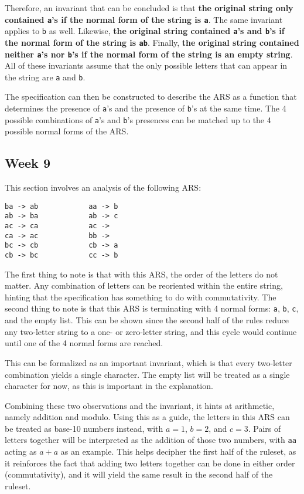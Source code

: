 \documentclass{article}
\theoremstyle{theorem}
\theoremstyle{definition}
\theoremstyle{remark}
\begin{document}
Therefore, an invariant that can be concluded is that \textbf{the original string only contained \texttt{a}'s if the normal form of the string is \texttt{a}}. The same invariant applies to \texttt{b} as well. Likewise, \textbf{the original string contained \texttt{a}'s and \texttt{b}'s if the normal form of the string is \texttt{ab}}. Finally, \textbf{the original string contained neither \texttt{a}'s nor \texttt{b}'s if the normal form of the string is an empty string}. All of these invariants assume that the only possible letters that can appear in the string are \texttt{a} and \texttt{b}.

The specification can then be constructed to describe the ARS as a function that determines the presence of \texttt{a}'s and the presence of \texttt{b}'s at the same time. The 4 possible combinations of \texttt{a}'s and \texttt{b}'s presences can be matched up to the 4 possible normal forms of the ARS.

\newpage

\subsection{Week 9}

This section involves an analysis of the following ARS:
\begin{lstlisting}
ba -> ab            aa -> b
ab -> ba            ab -> c
ac -> ca            ac ->  
ca -> ac            bb ->
bc -> cb            cb -> a
cb -> bc            cc -> b
\end{lstlisting}

\noindent The first thing to note is that with this ARS, the order of the letters do not matter. Any combination of letters can be reoriented within the entire string, hinting that the specification has something to do with commutativity. The second thing to note is that this ARS is terminating with 4 normal forms: \texttt{a}, \texttt{b}, \texttt{c}, and the empty list. This can be shown since the second half of the rules reduce any two-letter string to a one- or zero-letter string, and this cycle would continue until one of the 4 normal forms are reached. 

This can be formalized as an important invariant, which is that every two-letter combination yields a single character. The empty list will be treated as a single character for now, as this is important in the explanation.

Combining these two observations and the invariant, it hints at arithmetic, namely addition and modulo. Using this as a guide, the letters in this ARS can be treated as base-10 numbers instead, with $a=1$, $b=2$, and $c=3$. Pairs of letters together will be interpreted as the addition of those two numbers, with \texttt{aa} acting as $a+a$ as an example. This helps decipher the first half of the ruleset, as it reinforces the fact that adding two letters together can be done in either order (commutativity), and it will yield the same result in the second half of the ruleset.
\end{document}
